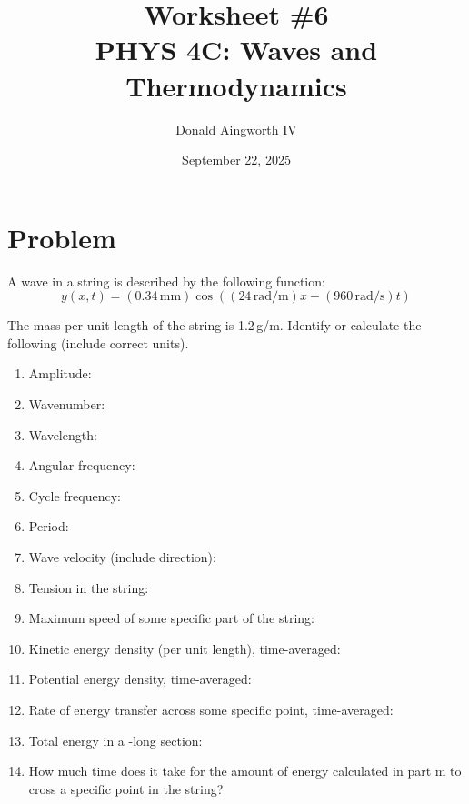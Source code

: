 \documentclass[12pt]{article}
\title{
    Worksheet \#6
    \\  \small
    PHYS 4C: Waves and Thermodynamics
    }
\author{Donald Aingworth IV}
\date{September 22, 2025}
\begin{document}

    \maketitle

    \section{Problem}
        A wave in a string is described by the following function:
        \begin{equation}
            y(x,t) = (0.34\,\unit{\milli\meter}) \cos((24\,\unit{\radian/\meter})x - (960\,\unit{\radian/\second})t)
        \end{equation}

        The mass per unit length of the string is 1.2\,\unit{\gram/\meter}.
        Identify or calculate the following (include correct units).

        \begin{enumerate}[label=\alph*)]
            \item Amplitude:
            \item Wavenumber:
            \item Wavelength:
            \item Angular frequency:
            \item Cycle frequency:
            \item Period:
            \item Wave velocity (include direction):
            \item Tension in the string:
            \item Maximum speed of some specific part of the string:
            \item Kinetic energy density (per unit length), time-averaged:
            \item Potential energy density, time-averaged:
            \item Rate of energy transfer across some specific point, time-averaged:
            \item Total energy in a -long section:
            \item How much time does it take for the amount of energy calculated in part m to cross a specific point in the string?
        \end{enumerate}
\end{document}
